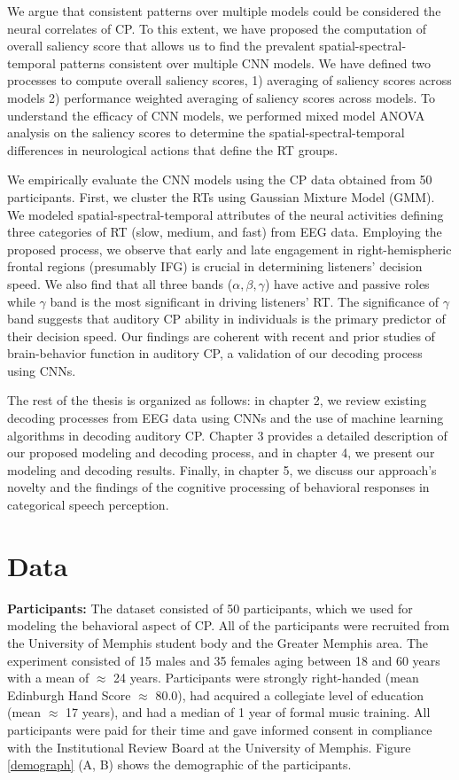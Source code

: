 \documentclass{article}
\begin{document}
We argue that consistent patterns over multiple models could be considered the neural correlates of CP. To this extent, we have proposed the computation of overall saliency score that allows us to find the prevalent spatial-spectral-temporal patterns consistent over multiple CNN models. We have defined two processes to compute overall saliency scores, 1) averaging of saliency scores across models 2) performance weighted averaging of saliency scores across models. To understand the efficacy of CNN models, we performed mixed model ANOVA analysis on the saliency scores to determine the spatial-spectral-temporal differences in neurological actions that define the RT groups.

We empirically evaluate the CNN models using the CP data obtained from 50 participants. First, we cluster the RTs using Gaussian Mixture Model (GMM). We modeled spatial-spectral-temporal attributes of the neural activities defining three categories of RT (slow, medium, and fast) from EEG data. Employing the proposed process, we observe that early and late engagement in right-hemispheric frontal regions (presumably IFG) is crucial in determining listeners' decision speed. We also find that all three bands ($\alpha, \beta, \gamma$) have active and passive roles while $\gamma$ band is the most significant in driving listeners' RT. The significance of $\gamma$ band suggests that auditory CP ability in individuals is the primary predictor of their decision speed. Our findings are coherent with recent and prior studies of brain-behavior function in auditory CP, a validation of our decoding process using CNNs.

The rest of the thesis is organized as follows: in chapter 2, we review existing decoding processes from EEG data using CNNs and the use of machine learning algorithms in decoding auditory CP. Chapter 3 provides a detailed description of our proposed modeling and decoding process, and in chapter 4, we present our modeling and decoding results. Finally, in chapter 5, we discuss our approach's novelty and the findings of the cognitive processing of behavioral responses in categorical speech perception.


\section{Data}

\textbf{Participants:} The dataset consisted of 50 participants, which we used for modeling the behavioral aspect of CP. All of the participants were recruited from the University of Memphis student body and the Greater Memphis area. The experiment consisted of 15 males and 35 females aging between 18 and 60 years with a mean of $\approx$ 24 years. Participants were strongly right-handed (mean Edinburgh Hand Score $\approx$ 80.0), had acquired a collegiate level of education (mean $\approx$ 17 years), and had a median of 1 year of formal music training. All participants were paid for their time and gave informed consent in compliance with the Institutional Review Board at the University of Memphis. Figure \ref{demograph} (A, B) shows the demographic of the participants.
\end{document}
